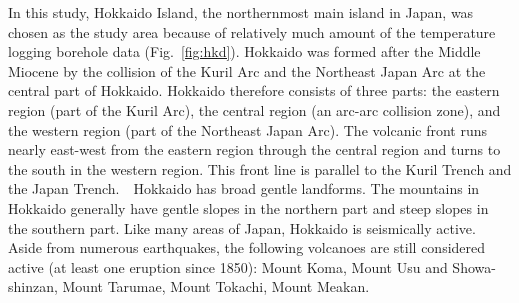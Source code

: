 
In this study, Hokkaido Island, the northernmost main island in Japan, was chosen as the study area because of relatively much amount of the temperature logging borehole data (Fig.~\ref{fig:hkd}). Hokkaido was formed after the Middle Miocene by the collision of the Kuril Arc and the Northeast Japan Arc at the central part of Hokkaido. Hokkaido therefore consists of three parts: the eastern region (part of the Kuril Arc), the central region (an arc-arc collision zone), and the western region (part of the Northeast Japan Arc). The volcanic front runs nearly east-west from the eastern region through the central region and turns to the south in the western region. This front line is parallel to the Kuril Trench and the Japan Trench.　Hokkaido has broad gentle landforms. The mountains in Hokkaido generally have gentle slopes in the northern part and steep slopes in the southern part. Like many areas of Japan, Hokkaido is seismically active. Aside from numerous earthquakes, the following volcanoes are still considered active (at least one eruption since 1850): Mount Koma, Mount Usu and Showa-shinzan, Mount Tarumae, Mount Tokachi, Mount Meakan.
